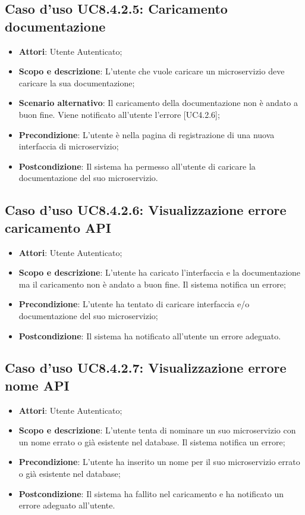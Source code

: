 \documentclass[12pt,a4paper,titlepage]{article}
\begin{document}
	\subsection{Caso d'uso UC8.4.2.5: Caricamento documentazione}
	\label{UC8.4.2.5}
	\begin{itemize}
		\item \textbf{Attori}: Utente Autenticato;
		\item \textbf{Scopo e descrizione}: L'utente che vuole caricare un microservizio deve caricare la sua documentazione;
		\item \textbf{Scenario alternativo}: Il caricamento della documentazione non è andato a buon fine. Viene notificato all'utente l'errore [UC4.2.6];
		\item \textbf{Precondizione}: L'utente è nella pagina di registrazione di una nuova interfaccia di microservizio;
		\item \textbf{Postcondizione}: Il sistema ha permesso all'utente di caricare la documentazione del suo microservizio.
	\end{itemize}
	\subsection{Caso d'uso UC8.4.2.6: Visualizzazione errore caricamento API}
	\label{UC8.4.2.6}
	\begin{itemize}
		\item \textbf{Attori}: Utente Autenticato;
		\item \textbf{Scopo e descrizione}: L'utente ha caricato l'interfaccia e la documentazione ma il caricamento non è andato a buon fine. Il sistema notifica un errore;
		\item \textbf{Precondizione}: L'utente ha tentato di caricare interfaccia e/o documentazione del suo microservizio;
		\item \textbf{Postcondizione}: Il sistema ha notificato all'utente un errore adeguato.
	\end{itemize}
	\subsection{Caso d'uso UC8.4.2.7: Visualizzazione errore nome API}
	\label{UC8.4.2.7}
	\begin{itemize}
		\item \textbf{Attori}: Utente Autenticato;
		\item \textbf{Scopo e descrizione}: L'utente tenta di nominare un suo microservizio con un nome errato o già esistente nel database. Il sistema notifica un errore;
		\item \textbf{Precondizione}: L'utente ha inserito un nome per il suo microservizio errato o già esistente nel database;
		\item \textbf{Postcondizione}: Il sistema ha fallito nel caricamento e ha notificato un errore adeguato all'utente.
	\end{itemize}
\end{document}
